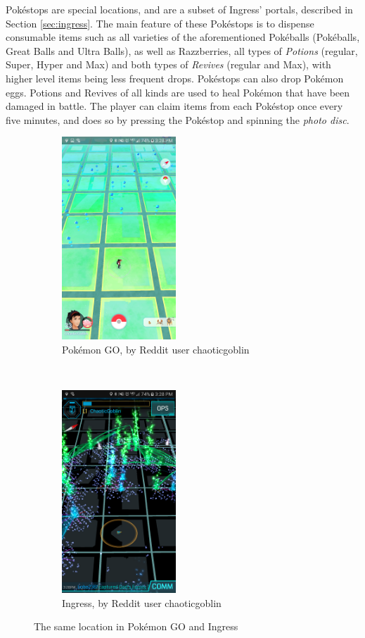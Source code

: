Pokéstops are special locations, and are a subset of Ingress' portals, described in Section \ref{sec:ingress}. The main feature of these Pokéstops is to dispense consumable items such as all varieties of the aforementioned Pokéballs (Pokéballs, Great Balls and Ultra Balls), as well as Razzberries, all types of \emph{Potions} (regular, Super, Hyper and Max) and both types of \emph{Revives} (regular and Max), with higher level items being less frequent drops. Pokéstops can also drop Pokémon eggs. Potions and Revives of all kinds are used to heal Pokémon that have been damaged in battle. The player can claim items from each Pokéstop once every five minutes, and does so by pressing the Pokéstop and spinning the \emph{photo disc}.

\begin{figure}[h]
	\centering
	\begin{subfigure}[t]{0.45\textwidth}
		\centering
		\includegraphics[height=3in]{Figures/pogo-map-of-ingress-equivalent}
		\caption{Pokémon GO, by Reddit user chaoticgoblin}
	\end{subfigure}
	~
	\begin{subfigure}[t]{0.45\textwidth}
		\centering
		\includegraphics[height=3in]{Figures/chaoticgoblin-ingress-screenshot}
		\caption{Ingress, by Reddit user chaoticgoblin}
	\end{subfigure}
	\caption{The same location in Pokémon GO and Ingress}
\end{figure}

